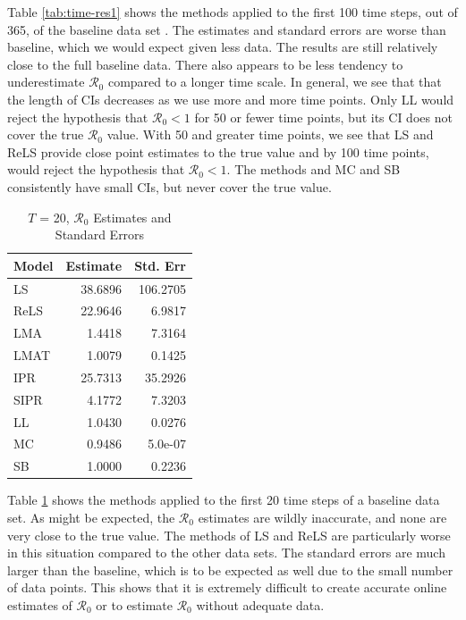 \documentclass[12pt]{article}
\newcommand{\rr}{\ensuremath{\mathcal{R}_0}}
\begin{document}
Table \ref{tab:time-res1} shows the methods applied to the first 100 time steps, out of 365, of the baseline data set . The estimates and standard errors are worse than baseline, which we would expect given less data. The results are still relatively close to the full baseline data. There also appears to be less tendency to underestimate $\rr$ compared to a longer time scale.  In general, we see that that the length of CIs decreases as we use more and more time points.  Only LL would reject the hypothesis that $\rr < 1$ for 50 or fewer time points, but its CI does not cover the true $\rr$ value.  With 50 and greater time points, we see that LS and ReLS provide close point estimates to the true value and by 100 time points, would reject the hypothesis that $\rr < 1$.  The methods and MC and SB consistently have small CIs, but never cover the true value.

\begin{table}[H]
  \centering
	\begin{tabular}[t]{l|r|r}
		\hline
		Model & Estimate & Std. Err\\
		\hline
		LS & 38.6896 & 106.2705\\
		\hline
		ReLS & 22.9646 & 6.9817\\
		\hline
		LMA & 1.4418 & 7.3164\\
		\hline
		LMAT & 1.0079 & 0.1425\\
		\hline
		IPR & 25.7313 & 35.2926\\
		\hline
		SIPR & 4.1772 & 7.3203\\
		\hline
		LL & 1.0430 & 0.0276\\
		\hline
		MC & 0.9486 & 5.0e-07\\
		\hline
		SB & 1.0000 & 0.2236\\
		\hline
	\end{tabular}
        \caption{$T$ = 20, $\rr$ Estimates and Standard Errors}\label{tab:time-res2}
\end{table}

Table \ref{tab:time-res2} shows the methods applied to the first 20 time steps of a baseline data set. As might be expected, the $\rr$ estimates are wildly inaccurate, and none are very close to the true value. The methods of LS and ReLS are particularly worse in this situation compared to the other data sets. The standard errors are much larger than the baseline, which is to be expected as well due to the small number of data points. This shows that it is extremely difficult to create accurate online estimates of $\rr$ or to estimate $\rr$ without adequate data. 
\end{document}
